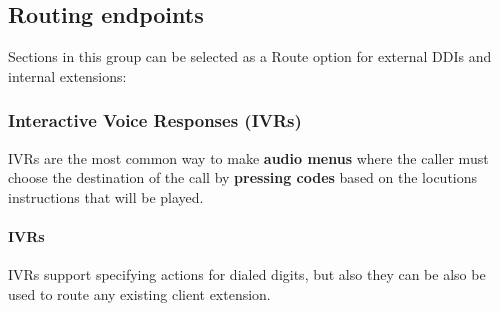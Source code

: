 \documentclass[letterpaper,10pt,english]{sphinxmanual}
\begin{document}
\subsection{Routing endpoints}
\label{administration_portal/client/vpbx/routing_endpoints/index:routing-endpoints}\label{administration_portal/client/vpbx/routing_endpoints/index::doc}
Sections in this group can be selected as a Route option for external DDIs and internal extensions:


\subsubsection{Interactive Voice Responses (IVRs)}
\label{administration_portal/client/vpbx/routing_endpoints/ivrs:interactive-voice-responses-ivrs}\label{administration_portal/client/vpbx/routing_endpoints/ivrs::doc}
IVRs are the most common way to make \textbf{audio menus} where the caller must
choose the destination of the call by \textbf{pressing codes} based on the locutions
instructions that will be played.


\paragraph{IVRs}
\label{administration_portal/client/vpbx/routing_endpoints/ivrs:ivrs}
IVRs support specifying actions for dialed digits, but also they can be also be used
to route any existing client extension.
\end{document}
